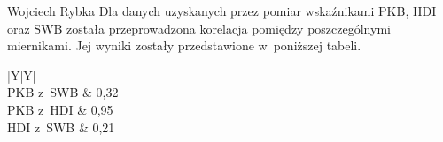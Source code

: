 \begin{artplenv}{Wojciech Rybka}
Dla danych uzyskanych przez pomiar wskaźnikami PKB, HDI oraz SWB została przeprowadzona korelacja pomiędzy
poszczególnymi miernikami. Jej wyniki zostały przedstawione w~poniższej tabeli. 

\captionsetup[table]{name=Tabela}
\begin{table}[H]
	\begin{tabularx}{\textwidth}{|Y|Y|}
		\hline
		\\\hline
		PKB z~SWB &
		0,32\\\hline
		PKB z~HDI &
		0,95\\\hline
		HDI z~SWB &
		0,21\\\hline
	\end{tabularx}
	
	\caption{Wartości związku pomiędzy poszczególnymi wskaźnikami dla Polski.
		Źródło: opracowanie własne na podstawie
		\parencite{international_monetary_fund_world_2019a,united_nations_development_programme_human_2019,noauthor_world_2018}.
		}
	\label{tab3:ryb}
\end{table}


%

\enlargethispage{1\baselineskip}


\end{artplenv}
